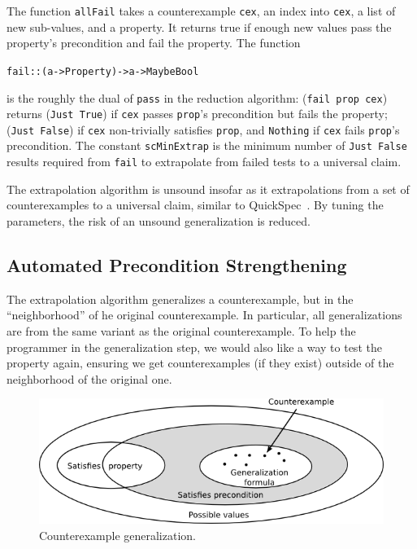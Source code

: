 \documentclass[10pt]{sigplanconf}
\newenvironment{code}{\begin{alltt}\small}{\end{alltt}}
\newcommand{\ttp}[1]{\texttt{#1}}
\begin{document}
The function \ttp{allFail} takes a counterexample \ttp{cex}, an index into
\ttp{cex}, a list of new sub-values, and a property.  It returns true if enough
new values pass the property's precondition and fail the property.  The function
%
\begin{code}
fail :: (a -> Property) -> a -> Maybe Bool
\end{code}
%
\noindent
is the roughly the dual of \ttp{pass} in the reduction algorithm: (\ttp{fail
  prop cex}) returns (\ttp{Just True}) if \ttp{cex} passes \ttp{prop}'s
precondition but fails the property; (\ttp{Just False}) if \ttp{cex}
non-trivially satisfies \ttp{prop}, and \ttp{Nothing} if \ttp{cex} fails
\ttp{prop}'s precondition.  The constant \ttp{scMinExtrap} is the minimum number
of \ttp{Just False} results required from \ttp{fail} to extrapolate from failed
tests to a universal claim.

The extrapolation algorithm is unsound insofar as it extrapolations from a set
of counterexamples to a universal claim, similar to QuickSpec~\cite{qs}.  By
tuning the parameters, the risk of an unsound generalization is reduced.

\subsection{Automated Precondition Strengthening}\label{sec:precondition}
The extrapolation algorithm generalizes a counterexample, but in the
``neighborhood'' of he original counterexample.  In particular, all
generalizations are from the same variant as the original counterexample.  To
help the programmer in the generalization step, we would also like a way to test
the property again, ensuring we get counterexamples (if they exist) outside of
the neighborhood of the original one.

\begin{figure}[ht!]
  \begin{center}
    \includegraphics[scale=0.49]{Figs/cex-gen}
   \end{center}
  \caption{Counterexample generalization.}
  \label{fig:cex-gen}
\end{figure}
\end{document}
